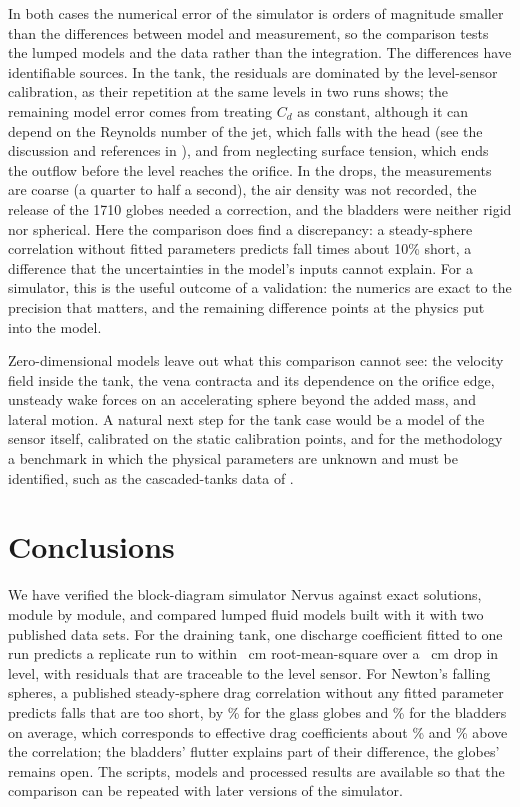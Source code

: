 \documentclass{jfm}
\begin{document}
In both cases the numerical error of the simulator is orders of magnitude smaller than the differences between
model and measurement, so the comparison tests the lumped models and the data rather than the integration. The
differences have identifiable sources. In the tank, the residuals are dominated by the level-sensor calibration,
as their repetition at the same levels in two runs shows; the remaining model error comes from treating $C_d$ as
constant, although it can depend on the Reynolds number of the jet, which falls with the head (see the discussion
and references in \citealt{Fabusola2025}), and from neglecting surface tension, which ends the outflow before the level reaches the orifice. In the drops, the
measurements are coarse (a quarter to half a second), the air density was not recorded, the release of the 1710
globes needed a correction, and the bladders were neither rigid nor spherical. Here the comparison does find a
discrepancy: a steady-sphere correlation without fitted parameters predicts fall times about 10\% short, a
difference that the uncertainties in the model's inputs cannot explain. For a simulator, this is the useful
outcome of a validation: the numerics are exact to the precision that matters, and the remaining difference
points at the physics put into the model.

Zero-dimensional models leave out what this comparison cannot see: the velocity field inside the tank, the vena
contracta and its dependence on the orifice edge, unsteady wake forces on an accelerating sphere beyond the
added mass, and lateral motion. A natural next step for the tank case would be a model of the sensor itself,
calibrated on the static calibration points, and for the methodology a benchmark in which the physical parameters
are unknown and must be identified, such as the cascaded-tanks data of \citet{Schoukens2017}.

\section{Conclusions}\label{sec:conclusions}

We have verified the block-diagram simulator Nervus against exact solutions, module by module, and compared
lumped fluid models built with it with two published data sets.
For the draining tank, one discharge coefficient fitted to one run predicts a replicate run to within
\TestRMSE~cm root-mean-square over a \LevelDrop~cm drop in level, with residuals that are traceable to the level sensor.
For Newton's falling spheres, a published steady-sphere drag correlation without any fitted parameter predicts
falls that are too short, by \GlobeRel\% for the glass globes and \BladderRel\% for the bladders on average,
which corresponds to effective drag coefficients about \GlobeCdRatio\% and \BladderCdRatio\% above the
correlation; the
bladders' flutter explains part of their difference, the globes' remains open. The scripts, models and processed results are
available so that the comparison can be repeated with later versions of the simulator.
\end{document}
